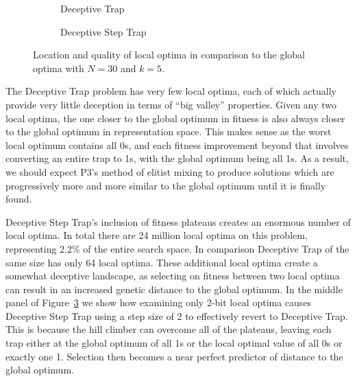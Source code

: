 \begin{figure}[t]
  \begin{centering}
    \begin{subfigure}{.44\textwidth}
      \begin{centering}
      \end{centering}
      \caption{Deceptive Trap}
      \label{fig-valley-dt}
    \end{subfigure}%
    \begin{subfigure}{.56\textwidth}
      \begin{centering}
      \end{centering}
      \caption{Deceptive Step Trap}
      \label{fig-valley-dst}
    \end{subfigure}
  \end{centering}
  \caption{Location and quality of local optima in comparison to the global optima with $N=30$ and $k=5$.}
  \label{fig-valley-trap}
\end{figure}

The Deceptive Trap problem has very few local optima, each of which actually
provide very little deception in terms of ``big valley'' properties. Given any two local optima, the one
closer to the global optimum in fitness is also always closer to the global optimum in representation space.
This makes sense as the worst local optimum contains all 0s, and each fitness improvement beyond that involves
converting an entire trap to 1s, with the global optimum being all 1s. As a result, we should expect P3's method
of elitist mixing to produce solutions which are progressively more and more similar to the global optimum until
it is finally found.

Deceptive Step Trap's inclusion of fitness plateaus creates an enormous number of local optima. In total there are 24
million local optima on this problem, representing 2.2\% of the entire search space. In comparison Deceptive Trap of the
same size has only 64 local optima. These additional local optima create a somewhat deceptive landscape, as selecting
on fitness between two local optima can result in an increased genetic distance to the global optimum. In the middle
panel of Figure~\ref{fig-valley-trap} we show how examining only 2-bit local optima causes Deceptive Step Trap using
a step size of 2 to effectively revert to Deceptive Trap. This is because the hill climber can overcome all of the plateaus,
leaving each trap either at the global optimum of all 1s or the local optimal value of all 0s or exactly one 1. Selection then
becomes a near perfect predictor of distance to the global optimum.


